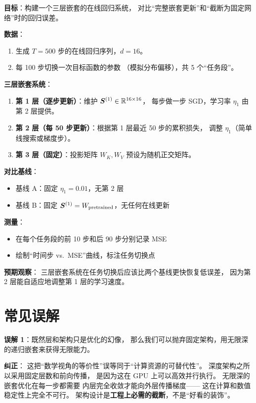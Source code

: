 \begin{labbox}[title=Lab 11：三层嵌套优化 vs.\ 固定网络的对比]

\textbf{目标}：构建一个三层嵌套的在线回归系统，
对比``完整嵌套更新''和``截断为固定网络''时的回归误差。

\textbf{数据}：
\begin{enumerate}
  \item 生成 $T = 500$ 步的在线回归序列，$d = 16$。
  \item 每 100 步切换一次目标函数的参数
        （模拟分布偏移），共 5 个``任务段''。
\end{enumerate}

\textbf{三层嵌套系统}：
\begin{enumerate}
  \item \textbf{第 1 层（逐步更新）}：维护 $\boldsymbol{S}^{(1)} \in \mathbb{R}^{16 \times 16}$，
        每步做一步 SGD，学习率 $\eta_1$ 由第 2 层提供。
  \item \textbf{第 2 层（每 50 步更新）}：根据第 1 层最近 50 步的累积损失，
        调整 $\eta_1$（简单线搜索或梯度步）。
  \item \textbf{第 3 层（固定）}：投影矩阵 $W_K, W_V$ 预设为随机正交矩阵。
\end{enumerate}

\textbf{对比基线}：
\begin{itemize}
  \item 基线 A：固定 $\eta_1 = 0.01$，无第 2 层
  \item 基线 B：固定 $\boldsymbol{S}^{(1)} = W_\text{pretrained}$，无任何在线更新
\end{itemize}

\textbf{测量}：
\begin{itemize}
  \item 在每个任务段的前 10 步和后 90 步分别记录 MSE
  \item 绘制``时间步 vs.\ MSE''曲线，标注任务切换点
\end{itemize}

\textbf{预期观察}：
三层嵌套系统在任务切换后应该比两个基线更快恢复低误差，
因为第 2 层能自适应地调整第 1 层的学习速度。
\end{labbox}

\section{常见误解}
\label{sec:nested_misconceptions}

\begin{misconceptionbox}
\textbf{误解 1}：既然层和架构只是优化的幻像，
那么我们可以抛弃固定架构，用无限深的递归嵌套来获得无限能力。

\textbf{纠正}：
这把``数学视角的等价性''误等同于``计算资源的可替代性''。
深度架构之所以采用固定层数和前向传播，
是因为这在 GPU 上可以高效并行执行。
无限深的嵌套优化在每一步都需要
内层完全收敛才能向外层传播梯度——
这在计算和数值稳定性上完全不可行。
架构设计是\textbf{工程上必需的截断}，不是``好看的装饰''。
\end{misconceptionbox}

